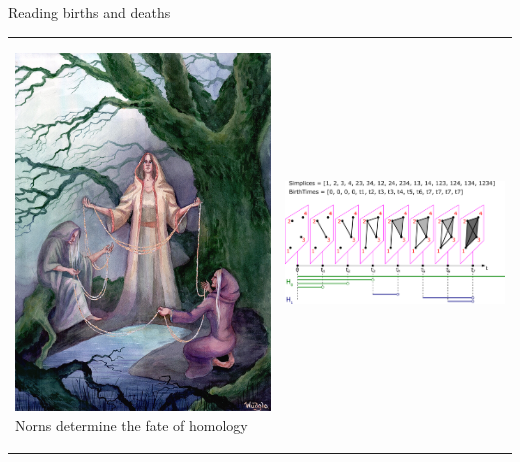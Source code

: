 \documentclass[10pt,xcolor={usenames}]{beamer}
\begin{document}
\begin{frame}{Reading births and deaths}

\begin{tabular}{M{4cm} p{8cm}}
\begin{center}
\includegraphics[scale=0.12]{pictures/norns.jpg} \break
{\footnotesize Norns determine the fate of homology}
\end{center}
  & \parbox{8cm}{ \begin{center}
                    \includegraphics[scale=0.08]{pictures/filtration7.pdf}

\end{center}}
\end{tabular}
\end{frame}
\end{document}

